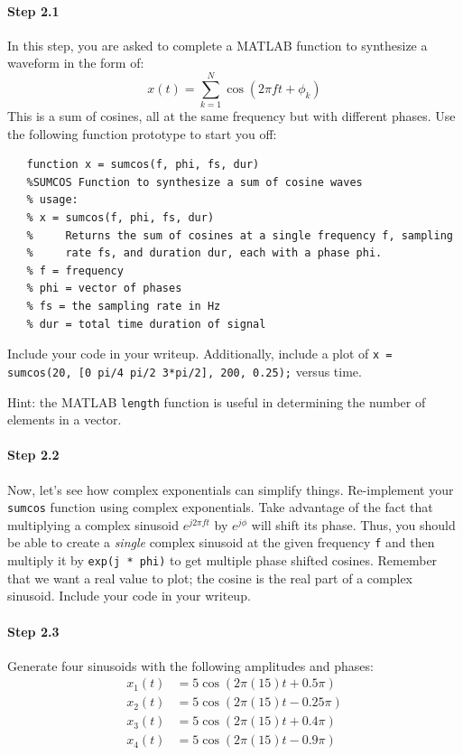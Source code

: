 \paragraph{Step 2.1} In this step, you are asked to complete a MATLAB
function to synthesize a waveform in the form of:
\begin{equation*}
x(t) = \sum_{k=1}^N \cos(2\pi f t + \phi_k)
\end{equation*}
This is a sum of cosines, all at the same frequency but with different
phases.  Use the following function prototype to start you off:
\begin{verbatim}
   function x = sumcos(f, phi, fs, dur)
   %SUMCOS Function to synthesize a sum of cosine waves
   % usage:
   % x = sumcos(f, phi, fs, dur)
   %     Returns the sum of cosines at a single frequency f, sampling
   %     rate fs, and duration dur, each with a phase phi.
   % f = frequency
   % phi = vector of phases
   % fs = the sampling rate in Hz
   % dur = total time duration of signal
\end{verbatim}

Include your code in your writeup. Additionally, include a plot of
\texttt{x = sumcos(20, [0 pi/4 pi/2 3*pi/2], 200, 0.25);} versus
time.

Hint: the MATLAB \texttt{length} function is useful in determining the
number of elements in a vector.


\paragraph{Step 2.2} Now, let's see how complex exponentials can
simplify things. Re-implement your \texttt{sumcos} function using
complex exponentials. Take advantage of the fact that multiplying a
complex sinusoid $e^{j2\pi f t}$ by $e^{j\phi}$ will shift its
phase. Thus, you should be able to create a \emph{single} complex
sinusoid at the given frequency \texttt{f} and then multiply it by
\texttt{exp(j * phi)} to get multiple phase shifted cosines. Remember
that we want a real value to plot; the cosine is the real part of a
complex sinusoid. Include your code in your writeup.


\paragraph{Step 2.3} Generate four sinusoids with the following
amplitudes and phases:
\begin{align}
x_1(t) &= 5 \cos(2\pi(15)t +0.5\pi) \\
x_2(t) &= 5 \cos(2\pi(15)t - 0.25\pi) \\
x_3(t) &= 5 \cos(2\pi(15)t +0.4\pi) \\
x_4(t) &= 5 \cos(2\pi(15)t - 0.9\pi) 
\end{align}

